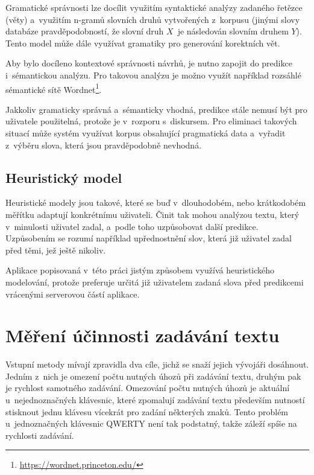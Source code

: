 \documentclass[a4paper,11pt,openany]{book} %
\begin{document}
Gramatické správnosti lze docílit využitím syntaktické analýzy zadaného řetězce (věty) a~využitím n-gramů slovních druhů vytvořených z~korpusu (jinými slovy databáze pravděpodobností, že slovní druh $X$~je následován slovním druhem $Y$). Tento model může dále využívat gramatiky pro generování korektních vět. \parencite[5234--5235]{ghayoomi2009overview}

Aby bylo docíleno kontextové správnosti návrhů, je nutno zapojit do predikce i~sémantickou analýzu. Pro takovou analýzu je možno využít například rozsáhlé sémantické sítě Wordnet\footnote{\url{https://wordnet.princeton.edu/}}. \parencite[5235]{ghayoomi2009overview}

Jakkoliv gramaticky správná a~sémanticky vhodná, predikce stále nemusí být pro uživatele použitelná, protože je v~rozporu s~diskursem. Pro eliminaci takových situací může systém využívat korpus obsahující pragmatická data a~vyřadit z~výběru slova, která jsou pravděpodobně nevhodná. \parencite[5235]{ghayoomi2009overview}

\section{Heuristický model}

Heuristické modely jsou takové, které se buď v~dlouhodobém, nebo krátkodobém měřítku adaptují konkrétnímu uživateli. Činit tak mohou analýzou textu, který v~minulosti uživatel zadal, a~podle toho uzpůsobovat další predikce. Uzpůsobením se rozumí například upřednostnění slov, která již uživatel zadal před těmi, jež ještě nikoliv. \parencite[5235]{ghayoomi2009overview}

Aplikace popisovaná v~této práci jistým způsobem využívá heuristického modelování, protože preferuje určitá již uživatelem zadaná slova před predikcemi vrácenými serverovou částí aplikace.

\chapter{Měření účinnosti zadávání textu}

Vstupní metody mívají zpravidla dva cíle, jichž se snaží jejich vývojáři dosáhnout. Jedním z~nich je omezení počtu nutných úhozů při zadávání textu, druhým pak je rychlost samotného zadávání. Omezování počtu nutných úhozů je aktuální u~nejednoznačných klávesnic, které zpomalují zadávání textu především nutností stisknout jednu klávesu vícekrát pro zadání některých znaků. Tento problém u~jednoznačných klávesnic QWERTY není tak podstatný, takže záleží spíše na rychlosti zadávání.
\end{document}
